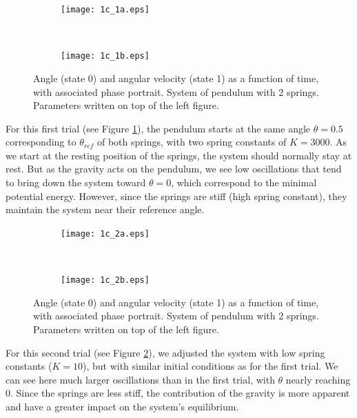 \documentclass{cmc}
\begin{document}
\begin{figure}[H]
    \centering
    \begin{subfigure}[b]{0.5\textwidth}
        \centering
        \texttt{[image: 1c\_1a.eps]}
    \end{subfigure}%
    ~
    \begin{subfigure}[b]{0.5\textwidth}
        \centering
        \texttt{[image: 1c\_1b.eps]}
    \end{subfigure}
    \caption{Angle (state 0) and angular velocity (state 1) as a function of time, with associated phase portrait. System of pendulum with 2 springs. Parameters written on top of the left figure.}
    \label{figure:1c1}
\end{figure}

For this first trial (see Figure \ref{figure:1c1}), the pendulum starts at the same angle $\theta=0.5$ corresponding to $\theta_{ref}$ of both springs, with two spring constants of $K=3000$. As we start at the resting position of the springs, the system should normally stay at rest. But as the gravity acts on the pendulum, we see low oscillations that tend to bring down the system toward $\theta=0$, which correspond to the minimal potential energy. However, since the springs are stiff (high spring constant), they maintain the system near their reference angle.

\begin{figure}[H]
    \centering
    \begin{subfigure}[b]{0.5\textwidth}
        \centering
        \texttt{[image: 1c\_2a.eps]}
    \end{subfigure}%
    ~
    \begin{subfigure}[b]{0.5\textwidth}
        \centering
        \texttt{[image: 1c\_2b.eps]}
    \end{subfigure}
    \caption{Angle (state 0) and angular velocity (state 1) as a function of time, with associated phase portrait. System of pendulum with 2 springs. Parameters written on top of the left figure.}
    \label{figure:1c2}
\end{figure}

For this second trial (see Figure \ref{figure:1c2}), we adjusted the system with low spring constants ($K=10$), but with similar initial conditions as for the first trial. We can see here much larger oscillations than in the first trial, with $\theta$ nearly reaching 0. Since the springs are less stiff, the contribution of the gravity is more apparent and have a greater impact on the system's equilibrium.
\end{document}
